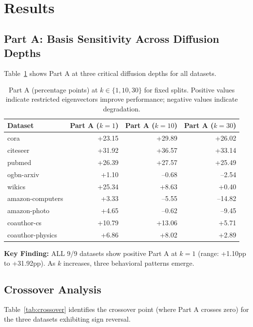 \documentclass[11pt]{article}
\begin{document}
\section{Results}

\subsection{Part A: Basis Sensitivity Across Diffusion Depths}

Table~\ref{tab:part_a_key_k} shows Part A at three critical diffusion depths for all datasets.

\begin{table}[h]
\centering
\caption{Part A (percentage points) at $k \in \{1, 10, 30\}$ for fixed splits. Positive values indicate restricted eigenvectors improve performance; negative values indicate degradation.}
\label{tab:part_a_key_k}
\begin{tabular}{lrrr}
\toprule
\textbf{Dataset} & \textbf{Part A ($k{=}1$)} & \textbf{Part A ($k{=}10$)} & \textbf{Part A ($k{=}30$)} \\
\midrule
cora             & +23.15 & +29.89 & +26.02 \\
citeseer         & +31.92 & +36.57 & +33.14 \\
pubmed           & +26.39 & +27.57 & +25.49 \\
ogbn-arxiv       & +1.10  & --0.68 & --2.54 \\
wikics           & +25.34 & +8.63  & +0.40  \\
amazon-computers & +3.33  & --5.55 & --14.82 \\
amazon-photo     & +4.65  & --0.62 & --9.45 \\
coauthor-cs      & +10.79 & +13.06 & +5.71  \\
coauthor-physics & +6.86  & +8.02  & +2.89  \\
\bottomrule
\end{tabular}
\end{table}

\textbf{Key Finding:} ALL 9/9 datasets show positive Part A at $k{=}1$ (range: +1.10pp to +31.92pp). As $k$ increases, three behavioral patterns emerge.

\subsection{Crossover Analysis}

Table~\ref{tab:crossover} identifies the crossover point (where Part A crosses zero) for the three datasets exhibiting sign reversal.
\end{document}
